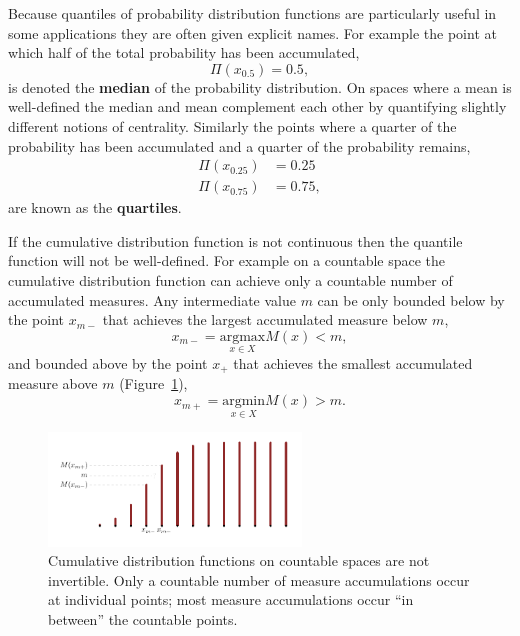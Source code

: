 \documentclass[
  letterpaper,
  DIV=11,
  numbers=noendperiod]{scrartcl}
\begin{document}
Because quantiles of probability distribution functions are particularly
useful in some applications they are often given explicit names. For
example the point at which half of the total probability has been
accumulated, \[
\Pi(x_{0.5}) = 0.5,
\] is denoted the \textbf{median} of the probability distribution. On
spaces where a mean is well-defined the median and mean complement each
other by quantifying slightly different notions of centrality. Similarly
the points where a quarter of the probability has been accumulated and a
quarter of the probability remains, \begin{align*}
\Pi(x_{0.25}) &= 0.25
\\
\Pi(x_{0.75}) &= 0.75,
\end{align*} are known as the \textbf{quartiles}.

If the cumulative distribution function is not continuous then the
quantile function will not be well-defined. For example on a countable
space the cumulative distribution function can achieve only a countable
number of accumulated measures. Any intermediate value \(m\) can be only
bounded below by the point \(x_{m-}\) that achieves the largest
accumulated measure below \(m\), \[
x_{m-} = \underset{x \in X}{\mathrm{argmax}} M(x) < m,
\] and bounded above by the point \(x_{+}\) that achieves the smallest
accumulated measure above \(m\)
(Figure~\ref{fig-quantile-inverse-problems}), \[
x_{m+} = \underset{x \in X}{\mathrm{argmin}} M(x) > m.
\]

\begin{figure}

{\centering \includegraphics[width=0.6\textwidth,height=\textheight]{figures/quantiles/inverse_problems/inverse_problems.pdf}

}

\caption{\label{fig-quantile-inverse-problems}Cumulative distribution
functions on countable spaces are not invertible. Only a countable
number of measure accumulations occur at individual points; most measure
accumulations occur ``in between'' the countable points.}

\end{figure}
\end{document}
